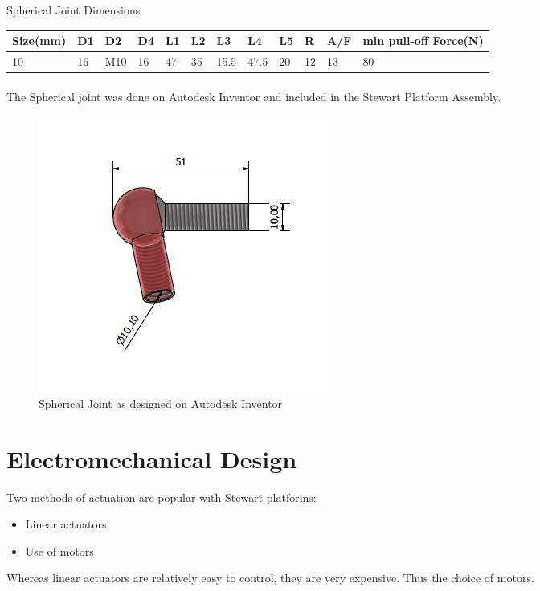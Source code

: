\begin{table}[!h]
\caption{Spherical Joint Dimensions}
\end{table}
\begin{tabular}{|l|l|l|l|l|l|l|l|l|l|l|l|}
\hline
\textbf{Size(mm)}& \textbf{D1}& \textbf{D2}&\textbf{ D4}& \textbf{L1}& \textbf{L2}& \textbf{L3}& \textbf{L4}& \textbf{L5}& \textbf{R} & \textbf{A/F} & \textbf{min pull-off Force(N)}\\
\hline
10 & 16 & M10 & 16 & 47 & 35 & 15.5 & 47.5& 20 & 12 & 13 & 80\\
\hline
\end{tabular}

\paragraph{}

The Spherical joint was done on Autodesk Inventor and included in the Stewart Platform Assembly.
\begin{center}
	\begin{figure}[!h]
	\centering
	\includegraphics[width=0.5\linewidth]{Figures/Spherical CAD}
	\caption[Spherical Joint CAD]{Spherical Joint as designed on Autodesk Inventor}
	\end{figure}
\end{center}

\section{Electromechanical Design}
Two methods of actuation are popular with Stewart platforms:
\begin{itemize}
\item Linear actuators
\item Use of motors
\end{itemize}
Whereas linear actuators are relatively easy to control, they are very expensive. Thus the choice of motors.
